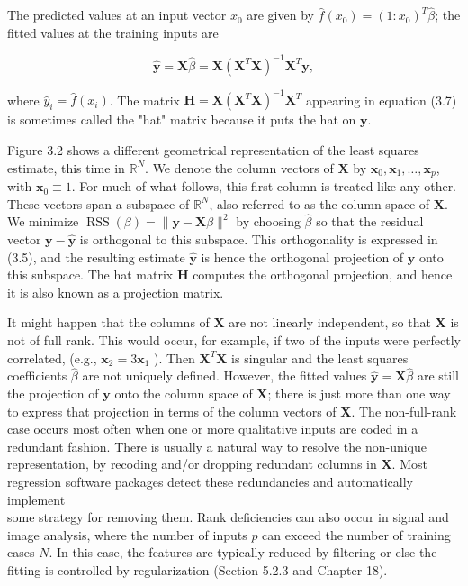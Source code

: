 \documentclass[10pt]{article}
\begin{document}
The predicted values at an input vector $x_{0}$ are given by $\hat{f}\left(x_{0}\right)=\left(1: x_{0}\right)^{T} \hat{\beta}$; the fitted values at the training inputs are


\begin{equation*}
\hat{\mathbf{y}}=\mathbf{X} \hat{\beta}=\mathbf{X}\left(\mathbf{X}^{T} \mathbf{X}\right)^{-1} \mathbf{X}^{T} \mathbf{y}, \tag{3.7}
\end{equation*}


where $\hat{y}_{i}=\hat{f}\left(x_{i}\right)$. The matrix $\mathbf{H}=\mathbf{X}\left(\mathbf{X}^{T} \mathbf{X}\right)^{-1} \mathbf{X}^{T}$ appearing in equation (3.7) is sometimes called the "hat" matrix because it puts the hat on $\mathbf{y}$.

Figure 3.2 shows a different geometrical representation of the least squares estimate, this time in $\mathbb{R}^{N}$. We denote the column vectors of $\mathbf{X}$ by $\mathbf{x}_{0}, \mathbf{x}_{1}, \ldots, \mathbf{x}_{p}$, with $\mathbf{x}_{0} \equiv 1$. For much of what follows, this first column is treated like any other. These vectors span a subspace of $\mathbb{R}^{N}$, also referred to as the column space of $\mathbf{X}$. We minimize $\operatorname{RSS}(\beta)=\|\mathbf{y}-\mathbf{X} \beta\|^{2}$ by choosing $\hat{\beta}$ so that the residual vector $\mathbf{y}-\hat{\mathbf{y}}$ is orthogonal to this subspace. This orthogonality is expressed in (3.5), and the resulting estimate $\hat{\mathbf{y}}$ is hence the orthogonal projection of $\mathbf{y}$ onto this subspace. The hat matrix $\mathbf{H}$ computes the orthogonal projection, and hence it is also known as a projection matrix.

It might happen that the columns of $\mathbf{X}$ are not linearly independent, so that $\mathbf{X}$ is not of full rank. This would occur, for example, if two of the inputs were perfectly correlated, (e.g., $\mathbf{x}_{2}=3 \mathbf{x}_{1}$ ). Then $\mathbf{X}^{T} \mathbf{X}$ is singular and the least squares coefficients $\hat{\beta}$ are not uniquely defined. However, the fitted values $\hat{\mathbf{y}}=\mathbf{X} \hat{\beta}$ are still the projection of $\mathbf{y}$ onto the column space of $\mathbf{X}$; there is just more than one way to express that projection in terms of the column vectors of $\mathbf{X}$. The non-full-rank case occurs most often when one or more qualitative inputs are coded in a redundant fashion. There is usually a natural way to resolve the non-unique representation, by recoding and/or dropping redundant columns in $\mathbf{X}$. Most regression software packages detect these redundancies and automatically implement\\
some strategy for removing them. Rank deficiencies can also occur in signal and image analysis, where the number of inputs $p$ can exceed the number of training cases $N$. In this case, the features are typically reduced by filtering or else the fitting is controlled by regularization (Section 5.2.3 and Chapter 18).
\end{document}
